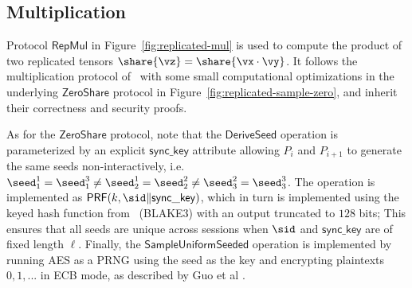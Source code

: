 \subsection{Multiplication}

Protocol $\mathsf{RepMul}$ in Figure~\ref{fig:replicated-mul} is used to compute the product of two replicated tensors $\share{\vz} = \share{\vx \cdot \vy}$. It follows the multiplication protocol of~\cite{CCS:AFLNO16} with some small computational optimizations in the underlying $\mathsf{ZeroShare}$ protocol in Figure~\ref{fig:replicated-sample-zero}, and inherit their correctness and security proofs.

As for the $\mathsf{ZeroShare}$ protocol, note that the $\mathsf{DeriveSeed}$
operation is parameterized by an explicit $\mathsf{sync\_key}$ attribute
allowing $P_i$ and $P_{i+1}$ to generate the same seeds non-interactively, i.e.
$\seed^1_1 = \seed^3_1 \not = \seed^1_2 = \seed^2_2 \not = \seed^2_3 =
\seed^3_3$. The operation is implemented as $\mathsf{PRF}(k, \sid \|
\mathsf{sync\_key})$, which in turn is implemented using the keyed hash function
from~\cite{url-blake3} (BLAKE3) with an output truncated to $128$ bits; This
ensures that all seeds are unique across sessions when $\sid$ and
$\mathsf{sync\_key}$ are of fixed length $\ell$. Finally, the
$\mathsf{SampleUniformSeeded}$ operation is implemented by running AES as a PRNG
using the seed as the key and encrypting plaintexts $0, 1, ...$ in ECB mode, as described by Guo et al \cite{SP:GKWY20}.


